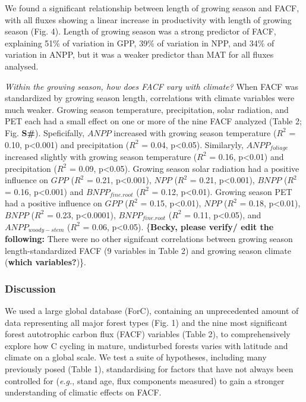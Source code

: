 \documentclass[]{article}
\begin{document}
We found a significant relationship between length of growing season and
FACF, with all fluxes showing a linear increase in productivity with
length of growing season (Fig. 4). Length of growing season was a strong
predictor of FACF, explaining 51\% of variation in GPP, 39\% of
variation in NPP, and 34\% of variation in ANPP, but it was a weaker
predictor than MAT for all fluxes analysed.

\emph{Within the growing season, how does FACF vary with climate?} When
FACF was standardized by growing season length, correlations with
climate variables were much weaker. Growing season temperature,
precipitation, solar radiation, and PET each had a small effect on one
or more of the nine FACF analyzed (Table 2; Fig. \textbf{S\#}).
Speficifally, \(ANPP\) increased with growing season temperature
(\(R^2\) = 0.10, p\textless{}0.001) and precipitation (\(R^2\) = 0.04,
p\textless{}0.05). Similaryly, \(ANPP_{foliage}\) increased slightly
with growing season temperature (\(R^2\) = 0.16, p\textless{}0.01) and
precipitation (\(R^2\) = 0.09, p\textless{}0.05). Growing season solar
radiation had a positive influence on \(GPP\) (\(R^2\) = 0.21,
p\textless{}0.001), \(NPP\) (\(R^2\) = 0.21, p\textless{}0.001),
\(BNPP\) (\(R^2\) = 0.16, p\textless{}0.001) and \(BNPP_{fine.root}\)
(\(R^2\) = 0.12, p\textless{}0.01). Growing season PET had a positive
influence on \(GPP\) (\(R^2\) = 0.15, p\textless{}0.01), \(NPP\)
(\(R^2\) = 0.18, p\textless{}0.01), \(BNPP\) (\(R^2\) = 0.23,
p\textless{}0.0001), \(BNPP_{fine.root}\) (\(R^2\) = 0.11,
p\textless{}0.05), and \(ANPP_{woody-stem}\) (\(R^2\) = 0.06,
p\textless{}0.05). \{\textbf{Becky, please verify/ edit the following:}
There were no other signifcant correlations between growing season
length-standardized FACF (9 variables in Table 2) and growing season
climate (\textbf{which variables?})\}.

\subsubsection{Discussion}\label{discussion}

We used a large global database (ForC), containing an unprecedented
amount of data representing all major forest types (Fig. 1) and the nine
most significant forest autotrophic carbon flux (FACF) variables (Table
2), to comprehensively explore how C cycling in mature, undisturbed
forests varies with latitude and climate on a global scale. We test a
suite of hypotheses, including many previously posed (Table 1),
standardising for factors that have not always been controlled for
(\emph{e.g.}, stand age, flux components measured) to gain a stronger
understanding of climatic effects on FACF.
\end{document}

